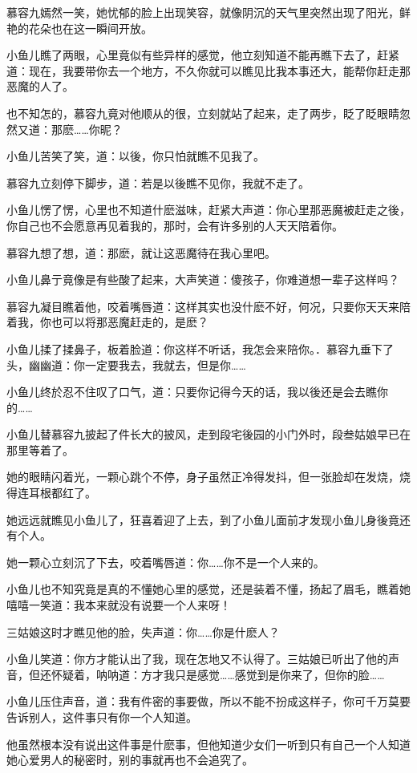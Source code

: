 \documentclass[12pt,oneside]{book}
\begin{document}
慕容九嫣然一笑，她忧郁的脸上出现笑容，就像阴沉的天气里突然出现了阳光，鲜艳的花朵也在这一瞬间开放。

小鱼儿瞧了两眼，心里竟似有些异样的感觉，他立刻知道不能再瞧下去了，赶紧道：现在，我要带你去一个地方，不久你就可以瞧见比我本事还大，能帮你赶走那恶魔的人了。

也不知怎的，慕容九竟对他顺从的很，立刻就站了起来，走了两步，眨了眨眼睛忽然又道：那麽\ldots\ldots 你昵？

小鱼儿苦笑了笑，道：以後，你只怕就瞧不见我了。

慕容九立刻停下脚步，道：若是以後瞧不见你，我就不走了。

小鱼儿愣了愣，心里也不知道什麽滋味，赶紧大声道：你心里那恶魔被赶走之後，你自己也不会愿意再见着我的，那时，会有许多别的人天天陪着你。

慕容九想了想，道：那麽，就让这恶魔待在我心里吧。

小鱼儿鼻亍竟像是有些酸了起来，大声笑道：傻孩子，你难道想一辈子这样吗？

慕容九凝目瞧着他，咬着嘴唇道：这样其实也没什麽不好，何况，只要你天天来陪着我，你也可以将那恶魔赶走的，是麽？

小鱼儿揉了揉鼻子，板着脸道：你这样不听话，我怎会来陪你。．慕容九垂下了头，幽幽道：你一定要我去，我就去，但是你\ldots\ldots{}

小鱼儿终於忍不住叹了口气，道：只要你记得今天的话，我以後还是会去瞧你的\ldots\ldots{}

小鱼儿替慕容九披起了件长大的披风，走到段宅後园的小门外时，段叁姑娘早已在那里等着了。

她的眼睛闪着光，一颗心跳个不停，身子虽然正冷得发抖，但一张脸却在发烧，烧得连耳根都红了。

她远远就瞧见小鱼儿了，狂喜着迎了上去，到了小鱼儿面前才发现小鱼儿身後竟还有个人。

她一颗心立刻沉了下去，咬着嘴唇道：你\ldots\ldots 你不是一个人来的。

小鱼儿也不知究竟是真的不懂她心里的感觉，还是装着不懂，扬起了眉毛，瞧着她嘻嘻一笑道：我本来就没有说要一个人来呀！

三姑娘这时才瞧见他的脸，失声道：你\ldots\ldots 你是什麽人？

小鱼儿笑道：你方才能认出了我，现在怎地又不认得了。三姑娘已听出了他的声音，但还怀疑着，呐呐道：方才我只是感觉\ldots\ldots 感觉到是你来了，但你的脸\ldots\ldots{}

小鱼儿压住声音，道：我有件密的事要做，所以不能不扮成这样子，你可千万莫要告诉别人，这件事只有你一个人知道。

他虽然根本没有说出这件事是什麽事，但他知道少女们一听到只有自己一个人知道她心爱男人的秘密时，别的事就再也不会追究了。
\end{document}
